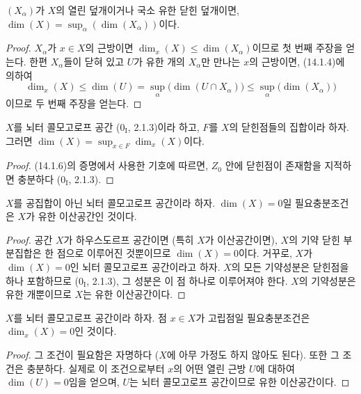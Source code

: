\begin{corollary}[14.1.7]
\label{0.14.1.7-fr}
$(X_\alpha)$가 $X$의 열린 덮개이거나 국소 유한 닫힌 덮개이면,
$\dim(X)=\sup_\alpha(\dim(X_\alpha))$이다.
\end{corollary}

\begin{proof}
$X_\alpha$가 $x\in X$의 근방이면
$\dim_x(X)\leq\dim(X_\alpha)$이므로 첫 번째 주장을 얻는다. 한편
$X_\alpha$들이 닫혀 있고 $U$가 유한 개의 $X_\alpha$만 만나는
$x$의 근방이면, (14.1.4)에 의하여
\[
  \dim_x(X)\leq\dim(U)=\sup_\alpha\bigl(\dim(U\cap X_\alpha)\bigr)
  \leq\sup_\alpha\bigl(\dim(X_\alpha)\bigr)
\]
이므로 두 번째 주장을 얻는다.
\end{proof}

\begin{corollary}[14.1.8]
\label{0.14.1.8-fr}
$X$를 뇌터 콜모고로프 공간 ($0_{\mathrm I}$, 2.1.3)이라 하고,
$F$를 $X$의 닫힌점들의 집합이라 하자. 그러면
$\dim(X)=\sup_{x\in F}\dim_x(X)$이다.
\end{corollary}

\begin{proof}
(14.1.6)의 증명에서 사용한 기호에 따르면, $Z_0$ 안에 닫힌점이
존재함을 지적하면 충분하다 ($0_{\mathrm I}$, 2.1.3).
\end{proof}

\begin{proposition}[14.1.9]
\label{0.14.1.9-fr}
$X$를 공집합이 아닌 뇌터 콜모고로프 공간이라 하자.
$\dim(X)=0$일 필요충분조건은 $X$가 유한 이산공간인 것이다.
\end{proposition}

\begin{proof}
공간 $X$가 하우스도르프 공간이면 (특히 $X$가 이산공간이면), $X$의 기약 닫힌
부분집합은 한 점으로 이루어진 것뿐이므로 $\dim(X)=0$이다. 거꾸로,
$X$가 $\dim(X)=0$인 뇌터 콜모고로프 공간이라고 하자. $X$의 모든
기약성분은 닫힌점을 하나 포함하므로 ($0_{\mathrm I}$, 2.1.3), 그
성분은 이 점 하나로 이루어져야 한다. $X$의 기약성분은 유한 개뿐이므로
$X$는 유한 이산공간이다.
\end{proof}

\begin{corollary}[14.1.10]
\label{0.14.1.10-fr}
$X$를 뇌터 콜모고로프 공간이라 하자. 점 $x\in X$가 고립점일
필요충분조건은 $\dim_x(X)=0$인 것이다.
\end{corollary}

\begin{proof}
그 조건이 필요함은 자명하다 ($X$에 아무 가정도 하지 않아도 된다).
또한 그 조건은 충분하다.
실제로 이 조건으로부터 $x$의 어떤 열린 근방 $U$에 대하여
$\dim(U)=0$임을 얻으며, $U$는 뇌터 콜모고로프 공간이므로 유한
이산공간이다.
\end{proof}

